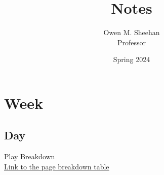 \documentclass[12pt]{article}
\title{\class{} Notes}
\author{Owen M. Sheehan\\Professor \prof{}}
\date{Spring 2024}
\begin{document}
\maketitle
\tableofcontents
\newpage

    \section{Week}
        \subsection{Day}
        \bigskip
            Play Breakdown \\ \href{https://docs.google.com/spreadsheets/d/1rfX3WRPZ5p48FkGvCMwufpCXzpJGYtOopoLjt8-UjJU/edit?gid=0#gid=0}{\underline{Link to the page breakdown table}}
\end{document}
